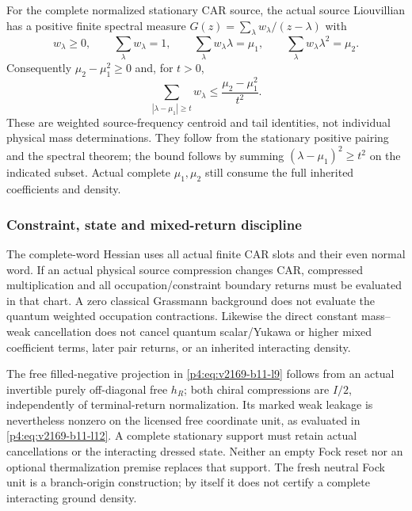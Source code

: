 \documentclass[12pt,a4paper]{article}
\begin{document}
For the complete normalized stationary CAR source, the actual source
Liouvillian has a positive finite spectral measure
$G(z)=\sum_\lambda w_\lambda/(z-\lambda)$ with
\[
 w_\lambda\ge0,\qquad \sum_\lambda w_\lambda=1,\qquad
 \sum_\lambda w_\lambda\lambda=\mu_1,\qquad
 \sum_\lambda w_\lambda\lambda^2=\mu_2.
\]
Consequently $\mu_2-\mu_1^2\ge0$ and, for $t>0$,
\[
 \sum_{|\lambda-\mu_1|\ge t}w_\lambda
       \le\frac{\mu_2-\mu_1^2}{t^2}.
\]
These are weighted source-frequency centroid and tail identities, not
individual physical mass determinations. They follow from the stationary
positive pairing and the spectral theorem; the bound follows by summing
$(\lambda-\mu_1)^2\ge t^2$ on the indicated subset. Actual complete
$\mu_1,\mu_2$ still consume the full inherited coefficients and density.

\subsubsection{Constraint, state and mixed-return discipline}
\label{p6:app:v2189-electron-state-scope}
The complete-word Hessian uses all actual finite CAR slots and their even
normal word. If an actual physical source compression changes CAR,
compressed multiplication and all occupation/constraint boundary returns
must be evaluated in that chart. A zero classical Grassmann background
does not evaluate the quantum weighted occupation contractions.
Likewise the direct constant mass--weak cancellation does not cancel
quantum scalar/Yukawa or higher mixed coefficient terms, later pair
returns, or an inherited interacting density.

The free filled-negative projection in
\eqref{p4:eq:v2169-b11-l9} follows from an actual invertible purely
off-diagonal free $h_R$; both chiral compressions are $I/2$, independently
of terminal-return normalization. Its marked weak leakage is nevertheless
nonzero on the licensed free coordinate unit, as evaluated in
\eqref{p4:eq:v2169-b11-l12}. A complete stationary support must retain
actual cancellations or the interacting dressed state. Neither an empty
Fock reset nor an optional thermalization premise replaces that support.
The fresh neutral Fock unit is a branch-origin construction; by itself it
does not certify a complete interacting ground density.





\setlength{\emergencystretch}{2em}
\end{document}
